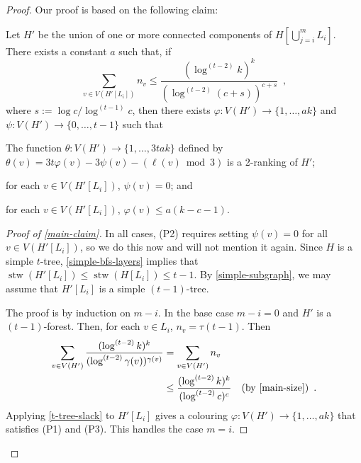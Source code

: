 \documentclass[kpfonts]{patmorin}
\DeclareMathOperator{\stw}{stw}
\theoremstyle{named}
\begin{document}
\begin{proof}
Our proof is based on the following claim:

    \begin{clm}\label{main-claim}
        Let $H'$ be the union of one or more connected components of $H[\bigcup_{j=i}^m L_i]$. There exists a constant $a$ such that, if
        \begin{equation}
            \sum_{v\in V(H'[L_i])} n_v\le \frac{(\log^{(t-2)} k)^{k}}{(\log^{(t-2)} (c+s))^{c+s}} \enspace , \label{main-size}
        \end{equation}
        where $s:=\log c/\log^{(t-1)} c$,
        then there exists $\varphi:V(H')\to\{1,\ldots,ak\}$ and $\psi:V(H')\to\{0,\ldots,t-1\}$ such that
        \begin{compactenum}[(P1)]
            \item The function $\theta:V(H')\to\{1,\ldots,3tak\}$ defined by $\theta(v)=3t\varphi(v) - 3\psi(v) -(\ell(v)\bmod 3)$ is a 2-ranking of $H'$;
            \item for each $v\in V(H'[L_i])$, $\psi(v)=0$; and
            \item for each $v\in V(H'[L_i])$, $\varphi(v)\le a(k-c-1)$.
        \end{compactenum}
    \end{clm}

    \begin{proof}[Proof of \cref{main-claim}]
        In all cases, (P2) requires setting $\psi(v)=0$ for all $v\in V(H'[L_i])$, so we do this now and will not mention it again.  Since $H$ is a simple $t$-tree, \cref{simple-bfs-layers} implies that $\stw(H'[L_i])\le \stw(H[L_i])\le t-1$.  By \cref{simple-subgraph}, we may assume that $H'[L_i]$ is a simple $(t-1)$-tree.

        The proof is by induction on $m-i$. In the base case $m-i=0$ and $H'$ is a $(t-1)$-forest.  Then, for each $v\in L_i$, $n_v=\tau(t-1)$.  Then
        \begin{align*}
            \sum_{v\in V(H')} \frac{(\log^{(t-2)} k)^k}{(\log^{(t-2)} \gamma(v))^{\gamma(v)}}
            & = \sum_{v\in V(H')} n_v \\
            & \le \frac{(\log^{(t-2)} k)^{k}}{(\log^{(t-2)} c)^c} & \text{(by \cref{main-size})} \enspace .
        \end{align*}
        Applying \cref{t-tree-slack} to $H'[L_i]$ gives a colouring $\varphi: V(H')\to\{1,\ldots,ak\}$ that satisfies (P1) and (P3).  This handles the case $m=i$.


\end{proof}
\end{proof}
\end{document}
